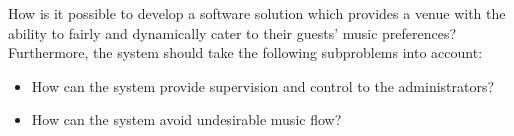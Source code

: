 How is it possible to develop a software solution which provides a venue with the ability to fairly and dynamically cater to their guests' music preferences?\\
Furthermore, the system should take the following subproblems into account:
\begin{itemize}
\item How can the system provide supervision and control to the administrators?
\item How can the system avoid undesirable music flow?
\end{itemize}